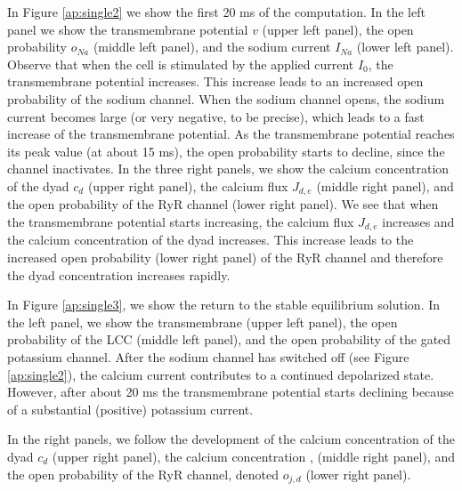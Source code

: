 In Figure \ref{ap:single2} we show the first 20 ms of the computation. In the left panel we show the transmembrane potential $v$ (upper left panel), the open probability $o_{Na}$ (middle left panel), and the sodium current $I_{Na}$ (lower left panel). Observe that when the cell is stimulated by the applied current $I_0$, the transmembrane potential increases. This increase leads to an increased open probability of the sodium channel. When the sodium channel opens, the sodium current becomes large (or very negative, to be precise), which leads to a fast increase of the transmembrane potential. As the transmembrane potential reaches its peak value (at about 15 ms), the open probability starts to decline, since the channel inactivates. In the three right panels, we show the calcium concentration of the dyad $c_d$ (upper right panel), the calcium flux $J_{d,e}$ (middle right panel), and the open probability of the RyR channel  (lower right panel). We see that when the transmembrane potential starts increasing, the calcium flux $J_{d,e}$ increases and the calcium concentration of the dyad increases. This increase leads to the increased open probability (lower right panel) of the RyR channel and therefore the dyad concentration increases rapidly.

In Figure \ref{ap:single3}, we show the return to the stable equilibrium solution. In the left panel, we show the transmembrane (upper left panel), the open probability of the LCC (middle left panel), and the open probability of the gated potassium channel. After the sodium channel has switched off (see Figure \ref{ap:single2}), the calcium current contributes to a continued depolarized state. However, after about 20 ms the transmembrane potential starts declining because of a substantial (positive) potassium current.

In the right panels, we follow the development of the calcium concentration of the dyad $c_d$ (upper right panel),  the calcium concentration
,
(middle right panel), and the open probability of the RyR channel, denoted $o_{j,d}$ (lower right panel).

